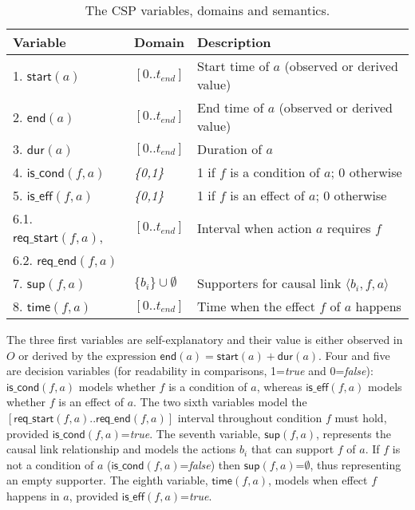 \documentclass{ecai}
\newcommand{\tup}[1]{{\langle #1 \rangle}}
\newcommand{\dur}{\mathsf{dur}}    %
\newcommand{\iscond}{\mathsf{is\_cond}}    %
\newcommand{\iseff}{\mathsf{is\_eff}}    %
\newcommand{\start}{\mathsf{start}}%
\newcommand{\en}{\mathsf{end}}     %
\newcommand{\supp}{\mathsf{sup}}   %
\newcommand{\tim}{\mathsf{time}}   %
\newcommand{\reqs}{\mathsf{req\_{start}}} %
\newcommand{\reqe}{\mathsf{req\_{end}}}   %
\begin{document}
\begin{table}
\begin{center}
\caption{The CSP variables, domains and semantics.}
\begin{scriptsize}
\begin{tabular}{llp{4.4cm}}
\hline	
{\bf Variable} & {\bf Domain} & {\bf Description} \\
\hline
1. $\start(a)$ & $[0..t_{end}]$ & Start time of $a$ (observed or derived value) \\
2. $\en(a)$ & $[0..t_{end}]$ & End time of $a$ (observed or derived value) \\
3. $\dur(a)$ & $[0..t_{end}]$ & Duration of $a$ \\

4. $\iscond(f,a)$ & \textit{\{0,1\}} & 1 if $f$ is a condition of $a$; 0 otherwise \\
5. $\iseff(f,a)$ & \textit{\{0,1\}} & 1 if $f$ is an effect of $a$; 0 otherwise \\

6.1. $\reqs(f,a)$, & $[0..t_{end}]$ & Interval when action $a$ requires $f$\\ 
6.2. $\reqe(f,a)$  &  & \\

7. $\supp(f,a)$ & $\{b_i\} \cup \emptyset $&  Supporters for causal link $\tup{b_i,f,a}$ \\ %
8. $\tim(f,a)$ & $[0..t_{end}]$ & Time when the effect $f$ of $a$ happens\\

\end{tabular}
\end{scriptsize}
\label{table:variables}
\end{center}
\end{table}

The three first variables are self-explanatory and their value is either observed in $O$ or derived by the expression $\en(a)=\start(a)+\dur(a)$.
Four and five are decision variables (for readability in comparisons, 1=\textit{true} and 0=\textit{false}): $\iscond(f,a)$ models whether $f$ is a condition of $a$, whereas $\iseff(f,a)$ models whether $f$ is an effect of $a$. The two sixth variables model the $[\reqs(f,a)..\reqe(f,a)]$ interval throughout condition $f$ must hold, provided $\iscond(f,a)$=\textit{true}.
The seventh variable, $\supp(f,a)$, represents the causal link relationship and models the actions $b_i$ that can support $f$ of $a$. If $f$ is not a condition of $a$ ($\iscond(f,a)$=\textit{false}) then $\supp(f,a)$=$\emptyset$, thus representing an empty supporter.
The eighth variable, $\tim(f,a)$, models when effect $f$ happens in $a$, provided $\iseff(f,a)$=\textit{true}.
\end{document}
